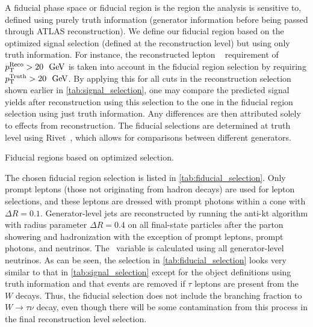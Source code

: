 A fiducial phase space or fiducial region is the 
region the analysis is sensitive to, defined 
using purely truth information (generator information before
being passed through ATLAS reconstruction).
We define our fiducial region
based on the optimized signal selection (defined at the reconstruction level)
but using only truth information. For instance, the reconstructed
lepton \pt~ requirement of 
$\pt^{\textrm{Reco}} > 20~\GeV$
is taken into account in the fiducial region selection
by requiring 
$\pt^{\textrm{Truth}} > 20~\GeV$.
By applying this for all cuts in the reconstruction selection
shown earlier in \tab\ref{tab:signal_selection},
one may compare the predicted signal yields after reconstruction
using this selection to the one in the fiducial region selection
using just truth information. Any differences are then attributed solely
to effects from reconstruction. 
The fiducial selections are determined at truth level 
using Rivet~\cite{Buckley:2010ar}, which allows for 
comparisons between different generators.


\begin{table}[ht!]
\centering
\begin{tiny}

\end{tiny}
\caption{Fiducial regions based on optimized selection.}
\label{tab:fiducial_selection}
\end{table}

The chosen fiducial region selection 
is listed in \tab\ref{tab:fiducial_selection}.
Only prompt leptons (those not originating from hadron decays) are used for 
lepton selections, and these leptons are dressed with prompt photons 
within a cone with $\Delta R = 0.1$. Generator-level jets are 
reconstructed by running the anti-kt algorithm with radius 
parameter $\Delta R = 0.4$ on all final-state particles 
after the parton showering and hadronization with the exception of prompt 
leptons, prompt photons, and neutrinos. The \MET~variable is calculated 
using all generator-level neutrinos. 
As can be seen, the selection 
in \tab\ref{tab:fiducial_selection} looks very similar to that in 
\tab\ref{tab:signal_selection} except for the object definitions
using truth information and that 
events are removed if $\tau$ leptons are present from the $W$ decays.  
Thus, the fiducial selection
does not include the branching fraction to $W\rightarrow\tau\nu$ decay, 
even though there will be some contamination from this process in the final 
reconstruction level selection. 



